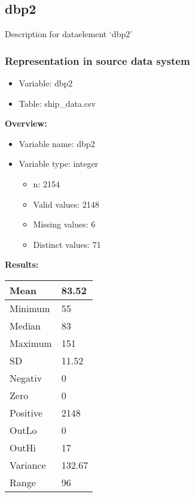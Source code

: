 \documentclass[
]{article}
\providecommand{\tightlist}{%
  \setlength{\itemsep}{0pt}\setlength{\parskip}{0pt}}
\begin{document}
\newpage

\hypertarget{dbp2}{%
\subsection{dbp2}\label{dbp2}}

Description for dataelement `dbp2'

\hypertarget{representation-in-source-data-system-4}{%
\subsubsection{\texorpdfstring{Representation in \textbf{source} data
system}{Representation in source data system}}\label{representation-in-source-data-system-4}}

\begin{itemize}
\tightlist
\item
  Variable: dbp2
\item
  Table: ship\_data.csv
\end{itemize}

\textbf{Overview:}

\begin{itemize}
\tightlist
\item
  Variable name: dbp2
\item
  Variable type: integer

  \begin{itemize}
  \tightlist
  \item
    n: 2154
  \item
    Valid values: 2148
  \item
    Missing values: 6
  \item
    Distinct values: 71
  \end{itemize}
\end{itemize}

\textbf{Results:}\\

\begin{table}[H]
\centering
\begin{tabular}{l|l}
\hline
Mean & 83.52\\
\hline
Minimum & 55\\
\hline
Median & 83\\
\hline
Maximum & 151\\
\hline
SD & 11.52\\
\hline
Negativ & 0\\
\hline
Zero & 0\\
\hline
Positive & 2148\\
\hline
OutLo & 0\\
\hline
OutHi & 17\\
\hline
Variance & 132.67\\
\hline
Range & 96\\
\hline
\end{tabular}
\end{table}
\end{document}
